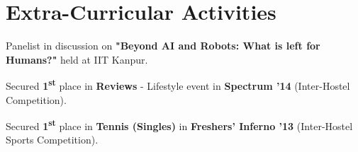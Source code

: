 \documentclass[a4paper]{norm-resume}
\begin{document}
\vspace{0mm}	%

\section{Extra-Curricular Activities \hrulefill}

\vspace{3mm} %

\begin{tightitemize}
	\item Panelist in discussion on \textbf{"Beyond AI and Robots: What is left for Humans?"} held at IIT Kanpur.\\
	\item Secured \textbf{1\textsuperscript{st}} place in \textbf{Reviews} - Lifestyle event in \textbf{Spectrum '14} (Inter-Hostel Competition).\\
	\item Secured \textbf{1\textsuperscript{st}} place in \textbf{Tennis (Singles)} in \textbf{Freshers' Inferno '13} (Inter-Hostel Sports Competition).\\	
\end{tightitemize}
\end{document}
